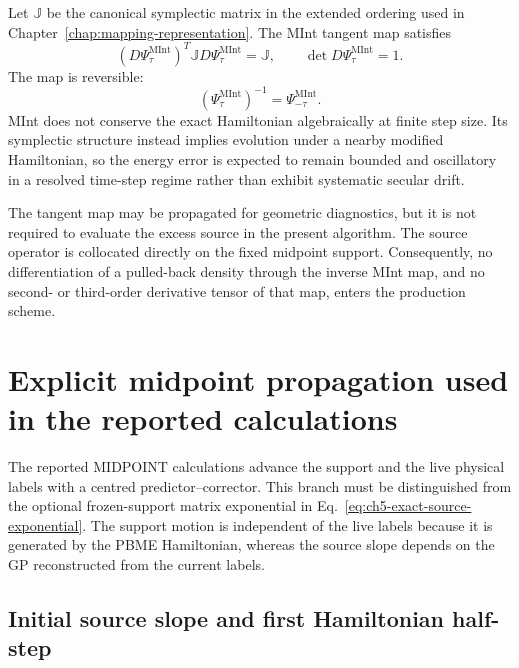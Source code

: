 \documentclass[
  11pt,
  letterpaper,
  onehalfspacing,
  normalmargins,
  equalmargins,
  oneside
]{ut-thesis}
\begin{document}
Let \(\mathbb J\) be the canonical symplectic matrix in the extended ordering
used in Chapter~\ref{chap:mapping-representation}. The MInt tangent map
satisfies
\begin{equation}
\left(D\Psi_\tau^{\mathrm{MInt}}\right)^T
\mathbb J
D\Psi_\tau^{\mathrm{MInt}}
=
\mathbb J,
\qquad
\det D\Psi_\tau^{\mathrm{MInt}}=1.
\label{eq:ch5-mint-symplecticity}
\end{equation}
The map is reversible:
\begin{equation}
\left(\Psi_\tau^{\mathrm{MInt}}\right)^{-1}
=
\Psi_{-\tau}^{\mathrm{MInt}}.
\label{eq:ch5-mint-reversibility}
\end{equation}
MInt does not conserve the exact Hamiltonian algebraically at finite step
size. Its symplectic structure instead implies evolution under a nearby
modified Hamiltonian, so the energy error is expected to remain bounded and
oscillatory in a resolved time-step regime rather than exhibit systematic
secular drift.

The tangent map may be propagated for geometric diagnostics, but it is not
required to evaluate the excess source in the present algorithm. The source
operator is collocated directly on the fixed midpoint support. Consequently,
no differentiation of a pulled-back density through the inverse MInt map, and
no second- or third-order derivative tensor of that map, enters the production
scheme.


\section{Explicit midpoint propagation used in the reported calculations}
\label{sec:ch5-strang-propagation}

The reported MIDPOINT calculations advance the support and the live physical
labels with a centred predictor--corrector. This branch must be distinguished
from the optional frozen-support matrix exponential in
Eq.~\eqref{eq:ch5-exact-source-exponential}. The support motion is independent
of the live labels because it is generated by the PBME Hamiltonian, whereas
the source slope depends on the GP reconstructed from the current labels.

\subsection{Initial source slope and first Hamiltonian half-step}
\label{subsec:ch5-first-transport-leg}
\end{document}
